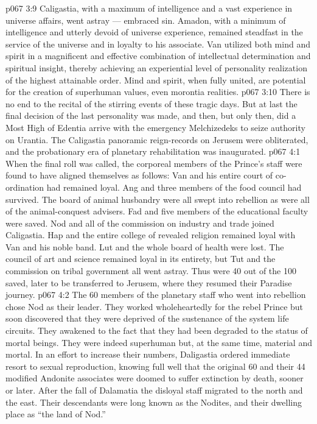 \vs p067 3:9 Caligastia, with a maximum of intelligence and a vast experience in universe affairs, went astray --- embraced sin. Amadon, with a minimum of intelligence and utterly devoid of universe experience, remained steadfast in the service of the universe and in loyalty to his associate. Van utilized both mind and spirit in a magnificent and effective combination of intellectual determination and spiritual insight, thereby achieving an experiential level of personality realization of the highest attainable order. Mind and spirit, when fully united, are potential for the creation of superhuman values, even morontia realities.
\vs p067 3:10 There is no end to the recital of the stirring events of these tragic days. But at last the final decision of the last personality was made, and then, but only then, did a Most High of Edentia arrive with the emergency Melchizedeks to seize authority on Urantia. The Caligastia panoramic reign\hyp{}records on Jerusem were obliterated, and the probationary era of planetary rehabilitation was inaugurated.
\vs p067 4:1 When the final roll was called, the corporeal members of the Prince’s staff were found to have aligned themselves as follows: Van and his entire court of co\hyp{}ordination had remained loyal. Ang and three members of the food council had survived. The board of animal husbandry were all swept into rebellion as were all of the animal\hyp{}conquest advisers. Fad and five members of the educational faculty were saved. Nod and all of the commission on industry and trade joined Caligastia. Hap and the entire college of revealed religion remained loyal with Van and his noble band. Lut and the whole board of health were lost. The council of art and science remained loyal in its entirety, but Tut and the commission on tribal government all went astray. Thus were 40 out of the 100 saved, later to be transferred to Jerusem, where they resumed their Paradise journey.
\vs p067 4:2 The 60 members of the planetary staff who went into rebellion chose Nod as their leader. They worked wholeheartedly for the rebel Prince but soon discovered that they were deprived of the sustenance of the system life circuits. They awakened to the fact that they had been degraded to the status of mortal beings. They were indeed superhuman but, at the same time, material and mortal. In an effort to increase their numbers, Daligastia ordered immediate resort to sexual reproduction, knowing full well that the original 60 and their 44 modified Andonite associates were doomed to suffer extinction by death, sooner or later. After the fall of Dalamatia the disloyal staff migrated to the north and the east. Their descendants were long known as the Nodites, and their dwelling place as “the land of Nod.”
